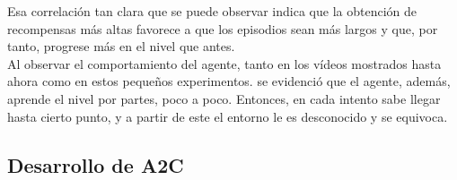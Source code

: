 \documentclass[11pt,fleqn]{book} %
\begin{document}
Esa correlación tan clara que se puede observar indica que la obtención de recompensas más altas favorece a que los episodios sean más largos y que, por tanto, progrese más en el nivel que antes. \\

Al observar el comportamiento del agente, tanto en los vídeos mostrados hasta ahora como en estos pequeños experimentos. se evidenció que el agente, además, aprende el nivel por partes, poco a poco. Entonces, en cada intento sabe llegar hasta cierto punto, y a partir de este el entorno le es desconocido y se equivoca.

\subsection{Desarrollo de A2C}





 
\end{document}
